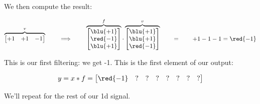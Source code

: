         We then compute the result:

        \begin{equation}
            \overbrace{
              \begin{bmatrix}
                  +1&+1&-1
              \end{bmatrix}
              }^{v}
              \qquad\implies \qquad
              \overbrace{\begin{bmatrix}
                    \blu{+1} \\ \red{-1} \\ \blu{+1}
                \end{bmatrix}}^{f} \cdot
                \overbrace{\begin{bmatrix}
                    \blu{+1} \\ \blu{+1} \\ \red{-1}
                \end{bmatrix}
                }^{v}
                \qquad=\qquad
                +1-1-1= \red{-1}
        \end{equation}

        

        This is our first filtering: we get -1. This is the first element of our output:

        \begin{equation}
            y = x \ast f =
            \begin{bmatrix}
                \red{-1} & ? & ? & ? & ? & ? & ? & ? 
            \end{bmatrix}
        \end{equation}
        
        We'll repeat for the rest of our 1d signal.
        
